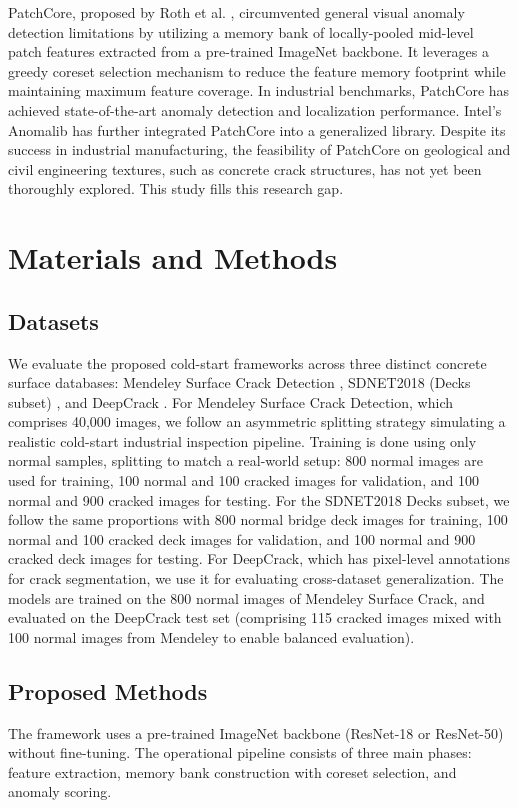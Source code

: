 \documentclass[runningheads]{llncs}
\begin{document}
PatchCore, proposed by Roth et al. \cite{roth2022towards}, circumvented general visual anomaly detection limitations by utilizing a memory bank of locally-pooled mid-level patch features extracted from a pre-trained ImageNet backbone. It leverages a greedy coreset selection mechanism to reduce the feature memory footprint while maintaining maximum feature coverage. In industrial benchmarks, PatchCore has achieved state-of-the-art anomaly detection and localization performance. Intel's Anomalib \cite{akcay2022anomalib} has further integrated PatchCore into a generalized library. Despite its success in industrial manufacturing, the feasibility of PatchCore on geological and civil engineering textures, such as concrete crack structures, has not yet been thoroughly explored. This study fills this research gap.

\section{Materials and Methods}
\label{sec:materials_methods}

\subsection{Datasets}
We evaluate the proposed cold-start frameworks across three distinct concrete surface databases: Mendeley Surface Crack Detection \cite{ozgenel2018performance}, SDNET2018 (Decks subset) \cite{dorafshan2018sdnet2018}, and DeepCrack \cite{zou2019deepcrack}.
For Mendeley Surface Crack Detection, which comprises 40,000 images, we follow an asymmetric splitting strategy simulating a realistic cold-start industrial inspection pipeline. Training is done using only normal samples, splitting to match a real-world setup: 800 normal images are used for training, 100 normal and 100 cracked images for validation, and 100 normal and 900 cracked images for testing.
For the SDNET2018 Decks subset, we follow the same proportions with 800 normal bridge deck images for training, 100 normal and 100 cracked deck images for validation, and 100 normal and 900 cracked deck images for testing.
For DeepCrack, which has pixel-level annotations for crack segmentation, we use it for evaluating cross-dataset generalization. The models are trained on the 800 normal images of Mendeley Surface Crack, and evaluated on the DeepCrack test set (comprising 115 cracked images mixed with 100 normal images from Mendeley to enable balanced evaluation).

\subsection{Proposed Methods}
The framework uses a pre-trained ImageNet backbone (ResNet-18 or ResNet-50) \cite{he2016deep} without fine-tuning. The operational pipeline consists of three main phases: feature extraction, memory bank construction with coreset selection, and anomaly scoring.
\end{document}
